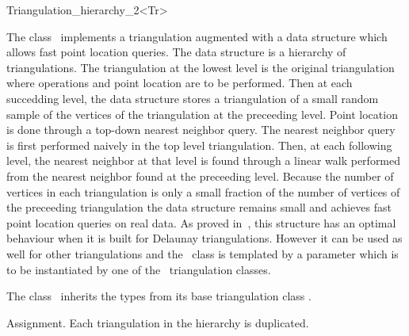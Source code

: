 

\begin{ccRefClass}{Triangulation_hierarchy_2<Tr>}

\ccDefinition
The class \ccRefName\ implements a triangulation augmented with
a data structure which allows fast point location queries.
The data structure is a hierarchy 
of triangulations. The triangulation at the lowest level is
the original triangulation where operations and point location are to 
be performed.
Then at each succedding level, the data structure
stores a triangulation of a small random sample of the vertices
of the triangulation at the preceeding level. Point location
is done through a top-down nearest neighbor query.
The nearest neighbor query is first
performed naively in the top level triangulation.
Then, at each following level, the nearest neighbor at that level
is found through a linear walk performed from
the nearest neighbor found at the preceeding level.
Because the number of vertices in each triangulation is only a small
fraction of the number of vertices of the preceeding triangulation 
the data structure remains small and achieves fast point location 
queries on real
data. As proved in~\cite{d-iirdt-98}, this structure has an optimal behaviour
when it is built for Delaunay triangulations.
However it can be used as well for other triangulations
and the \ccRefName\ class is templated by a parameter
which is to be instantiated by one of the \cgal\ triangulation
classes.


\ccInheritsFrom


\ccTypes
The class \ccRefName\ inherits the types from its base triangulation
class . 

\ccCreation
{}  %

\ccGlue
{}
\ccGlue
{}
{Assignment. Each triangulation in the hierarchy is duplicated.}


\end{ccRefClass}
